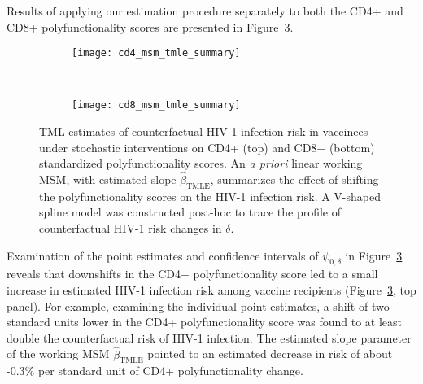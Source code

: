 Results of applying our estimation procedure separately to both the CD4+ and
CD8+ polyfunctionality scores are presented in
Figure~\ref{fig:hvtn505_tmle_msm}.

\begin{figure}[H]
  \begin{subfigure}{0.9\textwidth}
  \centering
  \texttt{[image: cd4\_msm\_tmle\_summary]}
  \label{fig:cd4_tmle_msm}
  \end{subfigure}\\[0.5cm]
  \begin{subfigure}{0.9\textwidth}
  \centering
  \texttt{[image: cd8\_msm\_tmle\_summary]}
  \label{fig:cd8_tmle_msm}
  \end{subfigure}
  \caption{TML estimates of counterfactual HIV-1 infection risk in vaccinees
    under stochastic interventions on CD4+ (top) and CD8+ (bottom) standardized
    polyfunctionality scores. An \textit{a priori} linear working MSM, with
    estimated slope $\hat{\beta}_{\text{TMLE}}$, summarizes the effect of
    shifting the polyfunctionality scores on the HIV-1 infection risk.
    A V-shaped spline model was constructed post-hoc to trace the profile of
    counterfactual HIV-1 risk changes in $\delta$.}
  \label{fig:hvtn505_tmle_msm}
\end{figure}

Examination of the point estimates and confidence intervals of $\psi_{0,\delta}$
in Figure~\ref{fig:hvtn505_tmle_msm} reveals that downshifts in the CD4+
polyfunctionality score led to a small increase in estimated HIV-1 infection
risk among vaccine recipients (Figure~\ref{fig:hvtn505_tmle_msm}, top panel).
For example, examining the individual point estimates, a shift of two standard
units lower in the CD4+ polyfunctionality score was found to at least double the
counterfactual risk of HIV-1 infection. The estimated slope parameter of the
working MSM $\hat{\beta}_{\text{TMLE}}$ pointed to an estimated decrease in risk
of about -0.3\% per standard unit of CD4+ polyfunctionality change.

